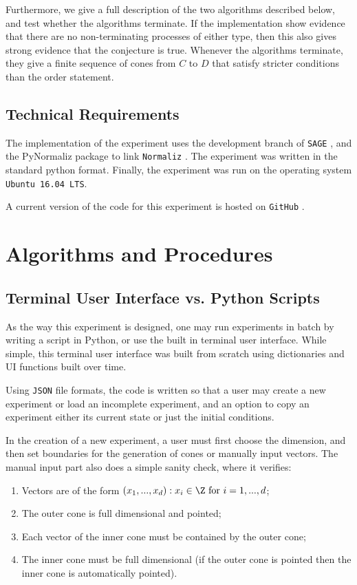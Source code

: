 \documentclass{TC}
\begin{document}
Furthermore, we give a full description of the two algorithms described below, and test whether the algorithms terminate. If the implementation show evidence that there are no non-terminating processes of either type, then this also gives strong evidence that the conjecture is true. Whenever the algorithms terminate, they give a finite sequence of cones from $C$ to $D$ that satisfy stricter conditions than the order statement.


\subsection{Technical Requirements}
The implementation of the experiment uses the development branch of \texttt{SAGE} \cite{sagemath}, and the PyNormaliz package to link \texttt{Normaliz} \cite{Normaliz}. The experiment was written in the standard python format. Finally, the experiment was run on the operating system \texttt{Ubuntu~16.04~LTS}. 

A current version of the code for this experiment is hosted on \texttt{GitHub} \cite{ChanGitHubMA}.

\section{Algorithms and Procedures}

\subsection{Terminal User Interface vs. Python Scripts}
As the way this experiment is designed, one may run experiments in batch by writing a script in Python, or use the built in terminal user interface. While simple, this terminal user interface was built from scratch using dictionaries and UI functions built over time. 

Using \texttt{JSON} file formats, the code is written so that a user may create a new experiment or load an incomplete experiment, and an option to copy an experiment either its current state or just the initial conditions.

In the creation of a new experiment, a user must first choose the dimension, and then set boundaries for the generation of cones or manually input vectors. The manual input part also does a simple sanity check, where it verifies:
\begin{enumerate}
\item Vectors are of the form $(x_1,...,x_d): x_i \in \Z \text{ for } i = 1,...,d$; 
\item The outer cone is full dimensional and pointed;
\item Each vector of the inner cone must be contained by the outer cone;
\item The inner cone must be full dimensional (if the outer cone is pointed then the inner cone is automatically pointed).
\end{enumerate}
\end{document}
